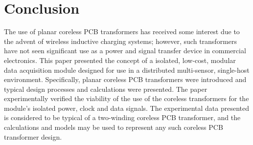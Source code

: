 \documentclass[conference]{IEEEtran}
\begin{document}
\section{Conclusion}
The use of planar coreless PCB transformers has received some interest due to the advent of wireless inductive charging systems; however, such transformers have not seen significant use as a power and signal transfer device in commercial electronics.  This paper presented the concept of a isolated, low-cost, modular data acquisition module designed for use in a distributed multi-sensor, single-host environment.  Specifically, planar coreless PCB transformers were introduced and typical design processes and calculations were presented.  The paper experimentally verified the viability of the use of the coreless transformers for the module's isolated power, clock and data signals.  The experimental data presented is considered to be typical of a two-winding coreless PCB transformer, and the calculations and models may be used to represent any such coreless PCB transformer design.  







\end{document}
